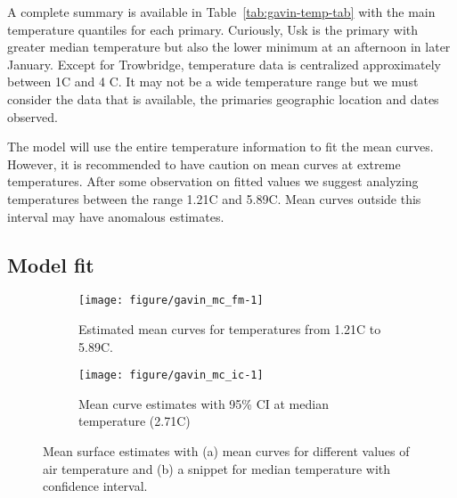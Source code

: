 A complete summary is available in Table~\ref{tab:gavin-temp-tab} with the main temperature quantiles for each primary. Curiously, Usk is the primary with greater median temperature but also the lower minimum at an afternoon in later January. Except for Trowbridge, temperature data is centralized approximately between 1\textdegree C and 4 \textdegree C. It may not be a wide temperature range but we must consider the data that is available, the primaries geographic location and dates observed. 


  The model will use the entire temperature information to fit the mean curves. However, it is recommended to have caution on mean curves at extreme temperatures. After some observation on fitted values we suggest analyzing temperatures between the range 1.21\textdegree C and 5.89\textdegree C. Mean curves outside this interval may have anomalous estimates.


\subsection{Model fit}
\label{sec:gavin-fmfit}

\begin{figure}[t]
  \begin{subfigure}{\textwidth}
    \centering
\begin{knitrout}
\color{fgcolor}
\texttt{[image: figure/gavin\_mc\_fm-1]} 

\end{knitrout}
    \caption{Estimated mean curves for temperatures from 1.21\textdegree C to 5.89\textdegree C.}
    \label{fig:gavin-fm-mc}    
  \end{subfigure}
  \begin{subfigure}{\textwidth}
    \centering
\begin{knitrout}
\color{fgcolor}
\texttt{[image: figure/gavin\_mc\_ic-1]} 

\end{knitrout}
    \label{fig:gavin-fm-ic}
    \caption{Mean curve estimates with 95\% CI at median temperature (2.71\textdegree C)}
  \end{subfigure}
  \caption{Mean surface estimates with (a) mean curves for different values of air temperature and (b) a snippet for median temperature with confidence interval.}
  \end{figure}

